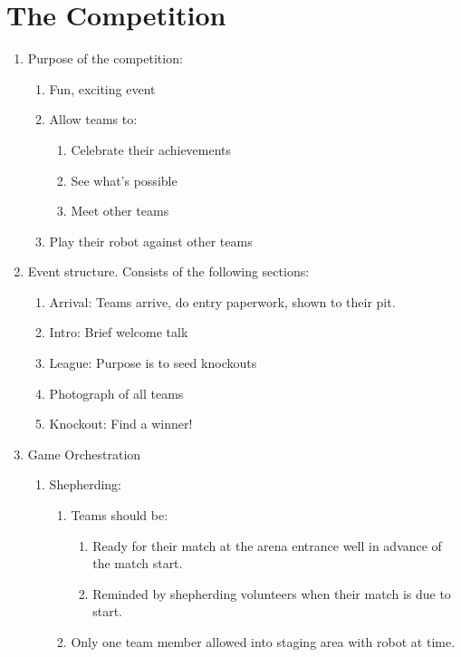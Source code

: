 \chapter{The Competition}

\begin{enumerate}
\item Purpose of the competition:
  \begin{enumerate}
  \item Fun, exciting event
  \item Allow teams to:
    \begin{enumerate}
    \item Celebrate their achievements
    \item See what's possible
    \item Meet other teams
    \end{enumerate}
  \item Play their robot against other teams
  \end{enumerate}

\item Event structure.  Consists of the following sections:
  \begin{enumerate}
  \item Arrival: Teams arrive, do entry paperwork, shown to their pit.
  \item Intro: Brief welcome talk
  \item League: Purpose is to seed knockouts
  \item Photograph of all teams
  \item Knockout: Find a winner!
  \end{enumerate}

\item Game Orchestration
  \begin{enumerate}
  \item Shepherding:
    \begin{enumerate}
    \item Teams should be:
      \begin{enumerate}
      \item Ready for their match at the arena entrance well in advance of the match start.
      \item Reminded by shepherding volunteers when their match is due to start.
      \end{enumerate}

    \item Only one team member allowed into staging area with robot at time.
    \end{enumerate}


\end{enumerate}
\end{enumerate}
